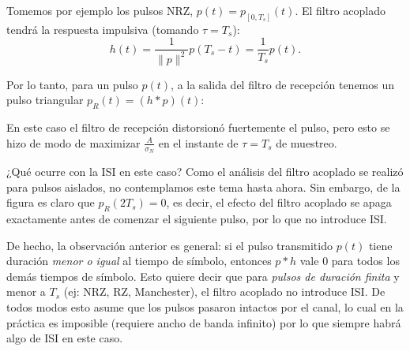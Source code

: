 \begin{ejemplo}

Tomemos por ejemplo los pulsos NRZ, $p(t) = p_{[0,T_s]}(t)$. El
filtro acoplado tendrá la respuesta impulsiva (tomando
$\tau=T_s$):
\begin{equation*}
h(t) = \frac{1}{\|p\|^2} p(T_s-t) = \frac{1}{T_s}p(t).
\end{equation*}

Por lo tanto, para un pulso $p(t)$, a la salida del filtro de recepción tenemos un pulso triangular $p_R(t)=(h*p)(t)$:
 \begin{center}
 \end{center}

En este caso el filtro de recepción distorsionó fuertemente el pulso, pero esto se  hizo de modo de maximizar $\frac{A}{\sigma_N}$ en el instante de $\tau=T_s$ de muestreo.

¿Qué ocurre con la ISI en este caso? Como el análisis del filtro acoplado se realizó para pulsos aislados, no contemplamos este tema hasta ahora. Sin embargo, de la figura es claro que $p_R(2T_s)=0$, es decir, el efecto del filtro acoplado se apaga exactamente antes de comenzar el siguiente pulso, por lo que no introduce ISI.
\end{ejemplo}

De hecho, la observación anterior es general: si el pulso transmitido $p(t)$ tiene duración \emph{menor o igual} al tiempo de símbolo, entonces $p*h$ vale $0$ para todos los demás tiempos de símbolo. Esto quiere decir que para \emph{pulsos de duración finita} y menor a $T_s$ (ej: NRZ, RZ, Manchester), el filtro acoplado no introduce ISI. De todos modos esto asume que los pulsos pasaron intactos por el canal, lo cual en la práctica es imposible (requiere ancho de banda infinito) por lo que siempre habrá algo de ISI en este caso.


